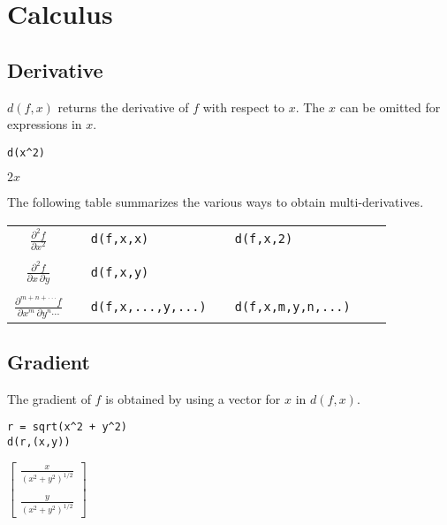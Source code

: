 \section{Calculus}

\subsection{Derivative}

$d(f,x)$ returns the derivative of $f$ with respect to $x$.
The $x$ can be omitted for expressions in $x$.

{\color{blue}
\begin{verbatim}
d(x^2)
\end{verbatim}
}

\noindent
$2x$

\bigskip
\noindent
The following table summarizes the various ways to obtain multi-derivatives.

\begin{center}
\begin{tabular}{cllllll}
$\displaystyle{\frac{\partial^2f}{\partial x^2}}$ & & \verb$d(f,x,x)$ & & \verb$d(f,x,2)$ \\
\\
$\displaystyle{\frac{\partial^2f}{\partial x\,\partial y}}$ & & \verb$d(f,x,y)$ \\
\\
$\displaystyle{\frac{\partial^{m+n+\cdot\cdot\cdot} f}{\partial x^m\,\partial y^n\cdots}}$ & &
\verb$d(f,x,...,y,...)$ & & \verb$d(f,x,m,y,n,...)$ \\
\end{tabular}
\end{center}

\subsection{Gradient}

The gradient of $f$ is obtained by using a vector for $x$ in $d(f,x)$.

{\color{blue}
\begin{verbatim}
r = sqrt(x^2 + y^2)
d(r,(x,y))
\end{verbatim}
}

\noindent
$\displaystyle
\begin{bmatrix}
{\displaystyle \frac{x}{(x^2+y^2)^{1/2}}}
\\
\\
{\displaystyle \frac{y}{(x^2+y^2)^{1/2}}}
\end{bmatrix}
$

